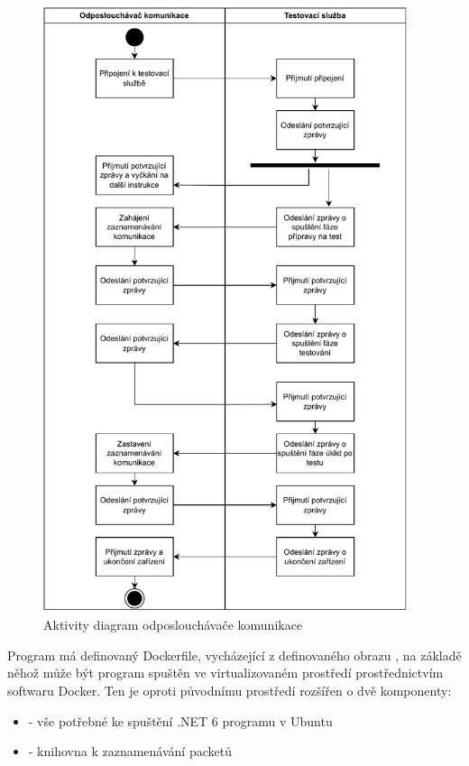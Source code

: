 \begin{figure}[htbp]
    \centering 
    \includegraphics[width=0.95\textwidth]{assets/img/activity_networklogger.pdf}
    \caption{Aktivity diagram odposlouchávače komunikace}
    \label{fig:logger_activity}
\end{figure}

Program má definovaný Dockerfile, vycházející z definovaného obrazu , na základě něhož může být program spuštěn ve virtualizovaném prostředí prostřednictvím softwaru Docker. Ten je oproti původnímu prostředí rozšířen o dvě komponenty:

\begin{itemize}
    \item {} - vše potřebné ke spuštění .NET 6 programu v Ubuntu
    \item {} - knihovna k zaznamenávání packetů 
\end{itemize}


